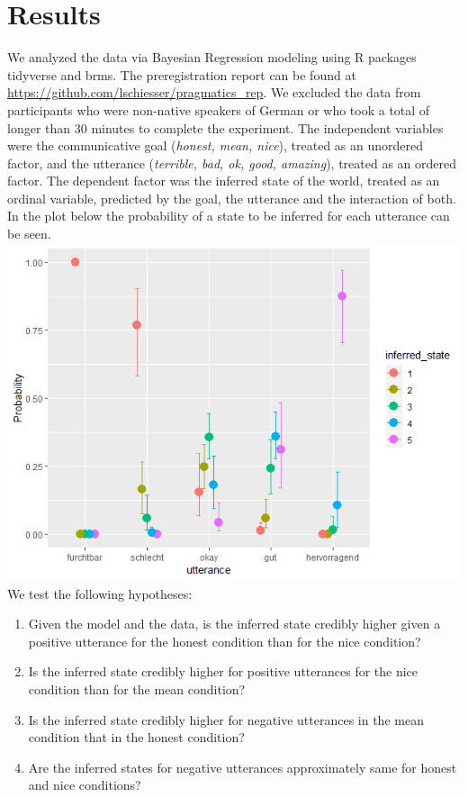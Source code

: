 \documentclass[a4paper,11pt]{article}
\begin{document}
\section{Results}
We analyzed the data via Bayesian Regression modeling using R packages tidyverse and brms. The preregistration report can be found at \url{https://github.com/lschiesser/pragmatics_rep}.  We excluded the data from participants who were non-native speakers of German or who took a total of longer than 30 minutes to complete the experiment. The independent variables were the communicative goal (\textit{honest, mean, nice}), treated as an unordered factor, and the utterance (\textit{terrible, bad, ok, good, amazing}), treated as an ordered factor. The dependent factor was the inferred state of the world, treated as an ordinal variable, predicted by the goal, the utterance and the interaction of both. In the plot below the probability of a state to be inferred for each utterance can be seen.
\\
\includegraphics[width=\textwidth]{final_report/prob-inferred-state.png} 
\\
We test the following hypotheses: \\
\begin{enumerate}
\item Given the model and the data, is the inferred state credibly higher given a positive utterance for the honest condition than for the nice condition?
\item  Is the inferred state credibly higher for positive utterances for the nice condition than for the mean condition?
\item Is the inferred state credibly higher for negative utterances in the mean condition that in the honest condition?
\item Are the inferred states for negative utterances approximately same for honest and nice conditions?
\end{enumerate}
\end{document}
